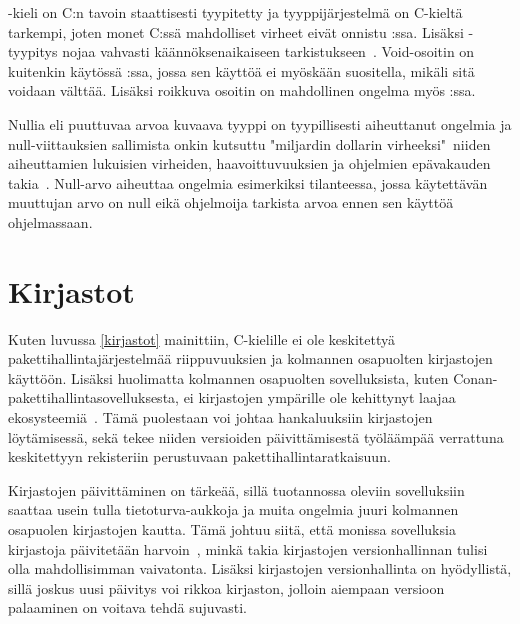 \Cpp-kieli on C:n tavoin staattisesti tyypitetty ja tyyppijärjestelmä on C-kieltä tarkempi, joten monet C:ssä mahdolliset virheet eivät onnistu \Cpp:ssa. Lisäksi \Cpp-tyypitys nojaa vahvasti käännöksenaikaiseen tarkistukseen~\cite[p.~13-14]{Cppbook}. Void-osoitin on kuitenkin käytössä \Cpp:ssa, jossa sen käyttöä ei myöskään suositella, mikäli sitä voidaan välttää. Lisäksi roikkuva osoitin on mahdollinen ongelma myös \Cpp:ssa.

Nullia eli puuttuvaa arvoa kuvaava tyyppi on tyypillisesti aiheuttanut ongelmia ja null-viittauksien sallimista onkin kutsuttu "miljardin dollarin virheeksi"~niiden aiheuttamien lukuisien virheiden, haavoittuvuuksien ja ohjelmien epävakauden takia~\cite{infoqnull}. Null-arvo aiheuttaa ongelmia esimerkiksi tilanteessa, jossa käytettävän muuttujan arvo on null eikä ohjelmoija tarkista arvoa ennen sen käyttöä ohjelmassaan.

\section{Kirjastot}
Kuten luvussa \ref{kirjastot} mainittiin, C-kielille ei ole keskitettyä pakettihallintajärjestelmää riippuvuuksien ja kolmannen osapuolten kirjastojen käyttöön. Lisäksi huolimatta kolmannen osapuolten sovelluksista, kuten Conan-pakettihallintasovelluksesta, ei kirjastojen ympärille ole kehittynyt laajaa ekosysteemiä~\cite{WOS:000449166500015}. Tämä puolestaan voi johtaa hankaluuksiin kirjastojen löytämisessä, sekä tekee niiden versioiden päivittämisestä työläämpää verrattuna keskitettyyn rekisteriin perustuvaan pakettihallintaratkaisuun.

Kirjastojen päivittäminen on tärkeää, sillä tuotannossa oleviin sovelluksiin saattaa usein tulla tietoturva-aukkoja ja muita ongelmia juuri kolmannen osapuolen kirjastojen kautta. Tämä johtuu siitä, että monissa sovelluksia kirjastoja päivitetään harvoin~\cite{veracode}, minkä takia kirjastojen versionhallinnan tulisi olla mahdollisimman vaivatonta. Lisäksi kirjastojen versionhallinta on hyödyllistä, sillä joskus uusi päivitys voi rikkoa kirjaston, jolloin aiempaan versioon palaaminen on voitava tehdä sujuvasti.